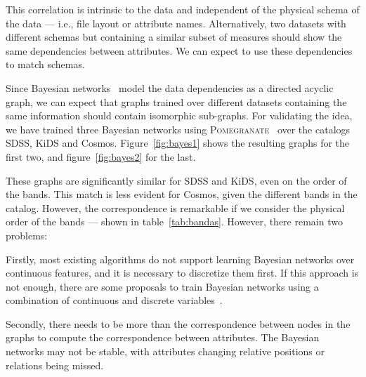 This correlation is intrinsic to the data and independent of the physical
schema of the data --- i.e., file layout or attribute names. Alternatively,
two datasets with different schemas but containing a similar subset of
measures should show the same dependencies between attributes. We can
expect to use these dependencies to match schemas\footnotemark.


Since Bayesian networks~\cite{pearl1988}  model the data dependencies
as a directed acyclic graph, we can expect that graphs trained over different
datasets containing the same information should contain isomorphic sub-graphs.
For validating the idea, we have trained three Bayesian networks using\linebreak
\textsc{Pomegranate}~\cite{schreiber_pomegranate_2017} over the catalogs
\gls{SDSS}, \gls{KiDS} and \gls{Cosmos}. Figure~\ref{fig:bayes1} shows the
resulting graphs for the first two, and figure~\ref{fig:bayes2} for the last.

These graphs are significantly similar for \gls{SDSS} and \gls{KiDS},
even on the order of the bands. This match is less evident for \gls{Cosmos},
given the different bands in the catalog. However, the correspondence is
remarkable if we consider the physical order of the bands --- shown in table~\ref{tab:bandas}.
However, there remain two problems:

Firstly, most existing algorithms do not support learning Bayesian networks over continuous features,
and it is necessary to discretize them first. If this approach is not enough, there are some
proposals to train Bayesian networks using a combination of continuous and discrete
variables~\cite{Lucas2015,chen2017}.

Secondly, there needs to be more than the correspondence between nodes in the graphs to compute
the correspondence between attributes. The Bayesian networks may not be stable, with
attributes changing relative positions or relations being missed.

